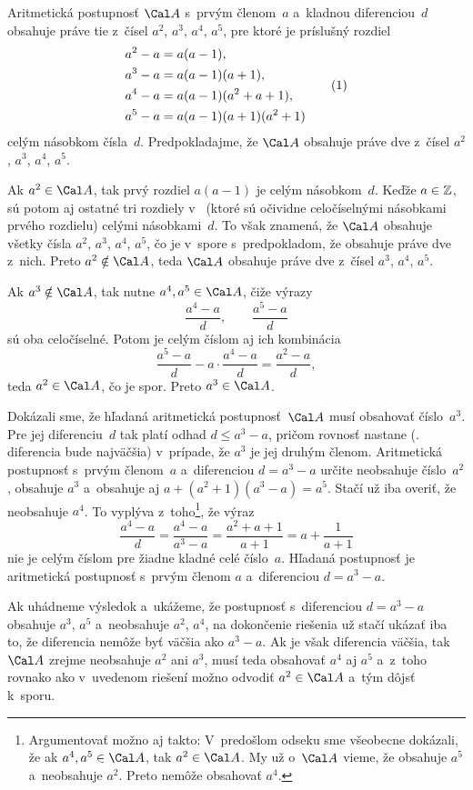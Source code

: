 {%
Aritmetická postupnosť $\Cal A$ s~prvým členom~$a$ a~kladnou diferenciou~$d$
obsahuje práve tie z~čísel $a^2$, $a^3$, $a^4$, $a^5$, pre ktoré
je príslušný rozdiel
$$\aligned
a^2-a&=a(a-1),\\
a^3-a&=a(a-1)(a+1),\\
a^4-a&=a(a-1)(a^2+a+1),\\
a^5-a&=a(a-1)(a+1)(a^2+1)\\
\endaligned
\tag1$$
celým násobkom čísla~$d$. Predpokladajme, že $\Cal A$ obsahuje práve dve z~čísel $a^2$, $a^3$, $a^4$, $a^5$.

Ak $a^2\in\Cal A$, tak prvý rozdiel $a(a-1)$ je celým násobkom~$d$. Keďže $a\in\Bbb Z$, sú potom aj ostatné tri rozdiely v~ (ktoré sú očividne celočíselnými násobkami prvého rozdielu) celými násobkami~$d$. To však znamená, že $\Cal A$ obsahuje všetky čísla $a^2$, $a^3$, $a^4$, $a^5$, čo je v~spore s~predpokladom, že obsahuje práve dve z~nich. Preto $a^2\notin\Cal A$, teda $\Cal A$ obsahuje práve dve z~čísel $a^3$, $a^4$, $a^5$.

Ak $a^3\notin\Cal A$, tak nutne $a^4,a^5\in\Cal A$, čiže výrazy
$$
\frac{a^4-a}d,\qquad\frac{a^5-a}d
$$
sú oba celočíselné. Potom je celým číslom aj ich kombinácia
$$
\frac{a^5-a}{d}-a\cdot\frac{a^4-a}{d}=\frac{a^2-a}{d},
$$
teda $a^2\in\Cal A$, čo je spor. Preto $a^3\in\Cal A$.

Dokázali sme, že hľadaná aritmetická postupnosť~$\Cal A$ musí obsahovať číslo~$a^3$. Pre jej diferenciu~$d$ tak platí odhad $d\le a^3-a$, pričom rovnosť nastane (\tj. diferencia bude najväčšia) v~prípade, že $a^3$ je jej druhým členom. Aritmetická postupnosť s~prvým členom~$a$ a~diferenciou $d=a^3-a$ určite neobsahuje číslo~$a^2$, obsahuje $a^3$ a~obsahuje aj $a+(a^2+1)(a^3-a)=a^5$. Stačí už iba overiť, že neobsahuje $a^4$. To vyplýva z~toho\footnote{Argumentovať možno aj takto: V~predošlom odseku sme všeobecne dokázali, že ak $a^4,a^5\in\Cal A$, tak $a^2\in\Cal A$. My už o~$\Cal A$ vieme, že obsahuje $a^5$ a~neobsahuje $a^2$. Preto nemôže obsahovať $a^4$.}, že výraz
$$
\frac{a^4-a}{d}=\frac{a^4-a}{a^3-a}=\frac{a^2+a+1}{a+1}=a+\frac{1}{a+1}
$$
nie je celým číslom pre žiadne kladné celé číslo~$a$.
\zaver
Hľadaná postupnosť je aritmetická postupnosť s~prvým členom $a$ a~diferenciou $d=a^3-a$.

\poznamka
Ak uhádneme výsledok a~ukážeme, že postupnosť s~diferenciou $d=a^3-a$ obsahuje $a^3$, $a^5$ a~neobsahuje $a^2$, $a^4$, na dokončenie riešenia už stačí ukázať iba to, že diferencia nemôže byť väčšia ako $a^3-a$. Ak je však diferencia väčšia, tak $\Cal A$ zrejme neobsahuje $a^2$ ani $a^3$, musí teda obsahovať $a^4$ aj $a^5$ a~z~toho rovnako ako v~uvedenom riešení možno odvodiť $a^2\in\Cal A$ a~tým dôjsť k~sporu.

}
